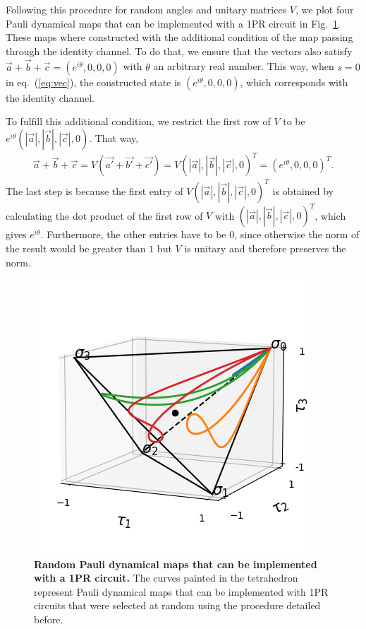 \documentclass[10pt,letterpaper]{article} %
\newcommand{\fref}[1]{Fig.~\ref{#1}}
\newcommand{\eref}[1]{eq.~(\ref{#1})}
\begin{document}
Following this procedure for random
angles and unitary matrices $V$, 
we plot four Pauli dynamical maps 
that can be implemented with a 1PR circuit in \fref{fig:curves-random}.
These maps where constructed with the additional condition
of the map passing through the identity channel.
To do that, we ensure that the vectors also satisfy
$\vec{a} + \vec{b} + \vec{c} = (e^{i \theta},0,0,0)$ with $\theta$ an arbitrary
real number.
This way, when $s = 0$ in \eref{eq:vec}, the constructed state
is $(e^{i \theta},0,0,0)$, which
corresponds with the identity channel.

To fulfill this additional condition,  we restrict the first row of
$V$ to be $e^{i\theta} (|\vec{a}|, |\vec{b}|, |\vec{c}|,0)$. 
That way, 
\begin{align*}
\vec{a} + \vec{b} + \vec{c} = V (\vec{a'} + \vec{b'} + \vec{c'}) = V(|\vec{a}|, |\vec{b}|, |\vec{c}|,0)^T = (e^{i\theta},0,0,0)^T.
\end{align*}
The last step is because the first entry of $V(|\vec{a}|, |\vec{b}|, |\vec{c}|,0)^T$
is obtained by calculating the dot product of the first row of $V$ with $(|\vec{a}|, |\vec{b}|, |\vec{c}|,0)^T$, which gives
$e^{i\theta}$. 
Furthermore, the other entries have to be $0$,
since otherwise the norm of the result would be greater than
$1$ but $V$ is unitary and therefore preserves the norm.

\begin{figure} %
\centering
\includegraphics{images/curvas-azar.png}
\caption{{\bf Random Pauli dynamical maps that can be implemented with a 1PR circuit.}
The curves painted in the tetrahedron
represent Pauli dynamical maps that can be implemented with 1PR circuits
that were selected at random using the procedure detailed before.}
\label{fig:curves-random}
\end{figure} %
\end{document}
